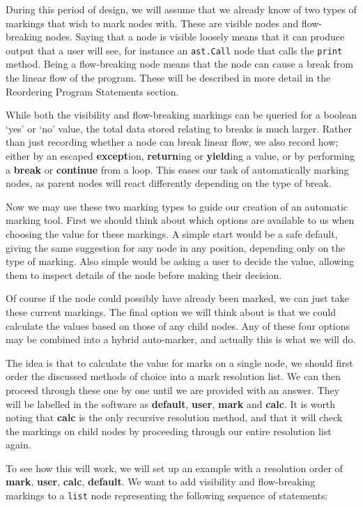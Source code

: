 \documentclass[twoside,a4paper]{report}
\begin{document}
During this period of design, we will assume that we already know of two types of markings that wish to mark nodes with. These are visible nodes
and flow-breaking nodes. Saying that a node is visible loosely means that it can produce output that a user will see, for instance an \texttt{ast.Call}
node that calls the \texttt{print} method. Being a flow-breaking node means that the node can cause a break from the linear flow of the program. These
will be described in more detail in the Reordering Program Statements section.

While both the visibility and flow-breaking markings can be queried for a boolean `yes' or `no' value, the total data stored relating to breaks is much
larger. Rather than just recording whether a node can break linear flow, we also record how; either by an escaped \textbf{except}ion,
\textbf{return}ing or \textbf{yield}ing a value, or by performing a \textbf{break} or \textbf{continue} from a loop. This eases our task of automatically
marking nodes, as parent nodes will react differently depending on the type of break.

Now we may use these two marking types to guide our creation of an automatic marking tool. First we should think about which options are available
to us when choosing the value for these markings. A simple start would be a safe default, giving the same suggestion for any node in any position,
depending only on the type of marking. Also simple would be asking a user to decide the value, allowing them to inspect details of the node before
making their decision.

Of course if the node could possibly have already been marked, we can just take these current markings. The final option we will think about is
that we could calculate the values based on those of any child nodes. Any of these four options may be combined into a hybrid auto-marker, and actually
this is what we will do.

The idea is that to calculate the value for marks on a single node, we should first order the discussed methods of choice into a mark resolution
list. We can then proceed through these one by one until we are provided with an answer. They will be labelled in the software as
\textbf{default}, \textbf{user}, \textbf{mark} and \textbf{calc}. It is worth noting that \textbf{calc} is the only recursive resolution method,
and that it will check the markings on child nodes by proceeding through our entire resolution list again.

To see how this will work, we will set up an example with a resolution order of \textbf{mark}, \textbf{user}, \textbf{calc}, \textbf{default}.
We want to add visibility and flow-breaking markings to a \texttt{list} node representing the following sequence of statements:
\end{document}
